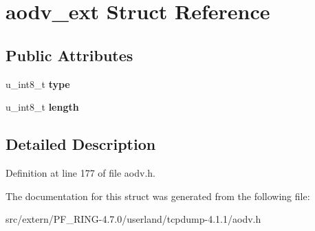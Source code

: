 \hypertarget{structaodv__ext}{
\section{aodv\_\-ext Struct Reference}
\label{structaodv__ext}
}
\subsection*{Public Attributes}
\begin{DoxyCompactItemize}
\item 
\hypertarget{structaodv__ext_a4c3c5eba33c62d87d212550c41aea6be}{
u\_\-int8\_\-t {\bfseries type}}
\label{structaodv__ext_a4c3c5eba33c62d87d212550c41aea6be}

\item 
\hypertarget{structaodv__ext_a15951aceeda711d6855f916c3468d408}{
u\_\-int8\_\-t {\bfseries length}}
\label{structaodv__ext_a15951aceeda711d6855f916c3468d408}

\end{DoxyCompactItemize}


\subsection{Detailed Description}


Definition at line 177 of file aodv.h.



The documentation for this struct was generated from the following file:\begin{DoxyCompactItemize}
\item 
src/extern/PF\_\-RING-\/4.7.0/userland/tcpdump-\/4.1.1/aodv.h\end{DoxyCompactItemize}
